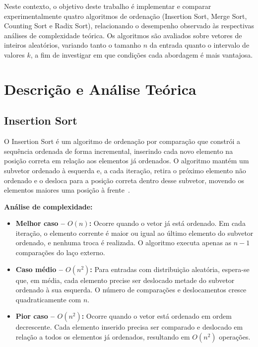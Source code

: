 \documentclass[12pt]{article}
\begin{document}
Neste contexto, o objetivo deste trabalho é implementar e comparar
experimentalmente quatro algoritmos de ordenação (Insertion Sort, Merge
Sort, Counting Sort e Radix Sort), relacionando o desempenho observado às
respectivas análises de complexidade teórica. Os algoritmos são avaliados
sobre vetores de inteiros aleatórios, variando tanto o tamanho $n$ da entrada
quanto o intervalo de valores $k$, a fim de investigar em que condições cada
abordagem é mais vantajosa.

\section{Descrição e Análise Teórica}
\label{sec:teoria}

\subsection{Insertion Sort}

O Insertion Sort é um algoritmo de ordenação por comparação que constrói a
sequência ordenada de forma incremental, inserindo cada novo elemento na
posição correta em relação aos elementos já ordenados. O algoritmo mantém um
subvetor ordenado à esquerda e, a cada iteração, retira o próximo elemento
não ordenado e o desloca para a posição correta dentro desse subvetor,
movendo os elementos maiores uma posição à frente~\cite{gfg-insertion}.

\textbf{Análise de complexidade:}
\begin{itemize}
  \item \textbf{Melhor caso -- $O(n)$:} Ocorre quando o vetor já está
    ordenado. Em cada iteração, o elemento corrente é maior ou igual ao
    último elemento do subvetor ordenado, e nenhuma troca é realizada. O
    algoritmo executa apenas as $n - 1$ comparações do laço externo.
  \item \textbf{Caso médio -- $O(n^2)$:} Para entradas com distribuição
    aleatória, espera-se que, em média, cada elemento precise ser deslocado
    metade do subvetor ordenado à sua esquerda. O número de comparações e
    deslocamentos cresce quadraticamente com $n$.
  \item \textbf{Pior caso -- $O(n^2)$:} Ocorre quando o vetor está ordenado
    em ordem decrescente. Cada elemento inserido precisa ser comparado e
    deslocado em relação a todos os elementos já ordenados, resultando em
    $O(n^2)$ operações.
\end{itemize}
\end{document}
